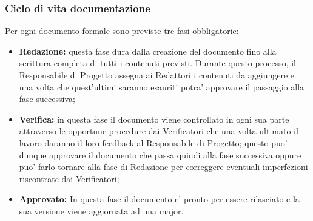 		\subsubsection{Ciclo di vita documentazione}
			Per ogni documento formale sono previste tre fasi obbligatorie:
			\begin{itemize}
			\item \textbf{Redazione:} questa fase dura dalla creazione del documento fino alla scrittura completa di tutti i contenuti previsti. Durante questo processo, il Responsabile di Progetto assegna ai Redattori i contenuti da aggiungere e una volta che quest'ultimi saranno esauriti potra' approvare il passaggio alla fase successiva;
			\item \textbf{Verifica:} in questa fase il documento viene controllato in ogni sua parte attraverso le opportune procedure dai Verificatori che una volta ultimato il lavoro daranno il loro feedback al Responsabile di Progetto; questo puo' dunque approvare il documento che passa quindi alla fase successiva oppure puo' farlo tornare alla fase di Redazione per correggere eventuali imperfezioni riscontrate dai Verificatori;
			\item \textbf{Approvato:} In questa fase il documento e' pronto per essere rilasciato e la sua versione viene aggiornata ad una major.
			\end{itemize}
